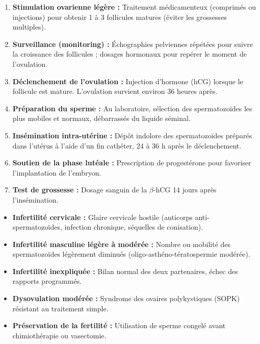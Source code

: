 \documentclass[11pt]{article}
\newcommand{\cle}[1]{{\popxbold\color{popdark}#1}}
\begin{document}
\begin{methode}
\begin{enumerate}
    \item \textbf{Stimulation ovarienne légère :} Traitement médicamenteux (comprimés ou injections) pour obtenir 1 à 3 follicules matures (éviter les grossesses multiples).
    \item \textbf{Surveillance (monitoring) :} Échographies pelviennes répétées pour suivre la croissance des follicules ; dosages hormonaux pour repérer le moment de l'ovulation.
    \item \textbf{Déclenchement de l'ovulation :} Injection d'hormone (hCG) lorsque le follicule est mature. L'ovulation survient environ 36 heures après.
    \item \textbf{Préparation du sperme :} Au laboratoire, sélection des spermatozoïdes les plus mobiles et normaux, débarrassés du liquide séminal.
    \item \textbf{Insémination intra-utérine :} Dépôt indolore des spermatozoïdes préparés dans l'utérus à l'aide d'un fin cathéter, 24 à 36 h après le déclenchement.
    \item \textbf{Soutien de la phase lutéale :} Prescription de progestérone pour favoriser l'implantation de l'embryon.
    \item \textbf{Test de grossesse :} Dosage sanguin de la \cle{$\beta$-hCG} 14 jours après l'insémination.
\end{enumerate}
\end{methode}

\begin{exemplebox}
\begin{itemize}
    \item \textbf{Infertilité cervicale :} Glaire cervicale hostile (anticorps anti-spermatozoïdes, infection chronique, séquelles de conisation).
    \item \textbf{Infertilité masculine légère à modérée :} Nombre ou mobilité des spermatozoïdes légèrement diminués (oligo-asthéno-tératospermie modérée).
    \item \textbf{Infertilité inexpliquée :} Bilan normal des deux partenaires, échec des rapports programmés.
    \item \textbf{Dysovulation modérée :} Syndrome des ovaires polykystiques (SOPK) résistant au traitement simple.
    \item \textbf{Préservation de la fertilité :} Utilisation de sperme congelé avant chimiothérapie ou vasectomie.
\end{itemize}
\end{exemplebox}
\end{document}
